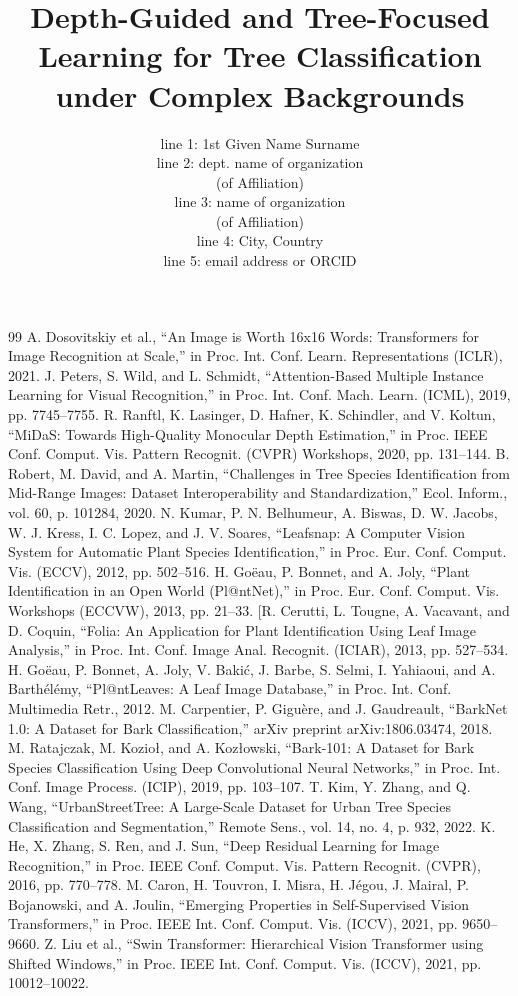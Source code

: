 \documentclass[10pt,twocolumn,letterpaper]{article}
\title{Depth-Guided and Tree-Focused Learning for Tree Classification under Complex Backgrounds}
\author{line 1: 1st Given Name Surname\\
line 2: dept. name of organization\\
(of Affiliation)\\
line 3: name of organization\\
(of Affiliation)\\
line 4: City, Country\\
line 5: email address or ORCID}
\begin{document}
\maketitle









\begingroup
\small
\begin{thebibliography}{99}
 A. Dosovitskiy et al., ``An Image is Worth 16x16 Words: Transformers for Image Recognition at Scale,'' in Proc. Int. Conf. Learn. Representations (ICLR), 2021.
 J. Peters, S. Wild, and L. Schmidt, ``Attention-Based Multiple Instance Learning for Visual Recognition,'' in Proc. Int. Conf. Mach. Learn. (ICML), 2019, pp. 7745–7755.
 R. Ranftl, K. Lasinger, D. Hafner, K. Schindler, and V. Koltun, ``MiDaS: Towards High-Quality Monocular Depth Estimation,'' in Proc. IEEE Conf. Comput. Vis. Pattern Recognit. (CVPR) Workshops, 2020, pp. 131–144.
 B. Robert, M. David, and A. Martin, ``Challenges in Tree Species Identification from Mid-Range Images: Dataset Interoperability and Standardization,'' Ecol. Inform., vol. 60, p. 101284, 2020.
 N. Kumar, P. N. Belhumeur, A. Biswas, D. W. Jacobs, W. J. Kress, I. C. Lopez, and J. V. Soares, ``Leafsnap: A Computer Vision System for Automatic Plant Species Identification,'' in Proc. Eur. Conf. Comput. Vis. (ECCV), 2012, pp. 502–516.
 H. Goëau, P. Bonnet, and A. Joly, ``Plant Identification in an Open World (Pl@ntNet),'' in Proc. Eur. Conf. Comput. Vis. Workshops (ECCVW), 2013, pp. 21–33.
 [R. Cerutti, L. Tougne, A. Vacavant, and D. Coquin, ``Folia: An Application for Plant Identification Using Leaf Image Analysis,'' in Proc. Int. Conf. Image Anal. Recognit. (ICIAR), 2013, pp. 527–534.
 H. Goëau, P. Bonnet, A. Joly, V. Bakić, J. Barbe, S. Selmi, I. Yahiaoui, and A. Barthélémy, ``Pl@ntLeaves: A Leaf Image Database,'' in Proc. Int. Conf. Multimedia Retr., 2012.
 M. Carpentier, P. Giguère, and J. Gaudreault, ``BarkNet 1.0: A Dataset for Bark Classification,'' arXiv preprint arXiv:1806.03474, 2018.
 M. Ratajczak, M. Kozioł, and A. Kozłowski, ``Bark-101: A Dataset for Bark Species Classification Using Deep Convolutional Neural Networks,'' in Proc. Int. Conf. Image Process. (ICIP), 2019, pp. 103–107.
 T. Kim, Y. Zhang, and Q. Wang, ``UrbanStreetTree: A Large-Scale Dataset for Urban Tree Species Classification and Segmentation,'' Remote Sens., vol. 14, no. 4, p. 932, 2022.
 K. He, X. Zhang, S. Ren, and J. Sun, ``Deep Residual Learning for Image Recognition,'' in Proc. IEEE Conf. Comput. Vis. Pattern Recognit. (CVPR), 2016, pp. 770–778.
 M. Caron, H. Touvron, I. Misra, H. Jégou, J. Mairal, P. Bojanowski, and A. Joulin, ``Emerging Properties in Self-Supervised Vision Transformers,'' in Proc. IEEE Int. Conf. Comput. Vis. (ICCV), 2021, pp. 9650–9660.
 Z. Liu et al., ``Swin Transformer: Hierarchical Vision Transformer using Shifted Windows,'' in Proc. IEEE Int. Conf. Comput. Vis. (ICCV), 2021, pp. 10012–10022.
\end{thebibliography}
\endgroup
\end{document}

